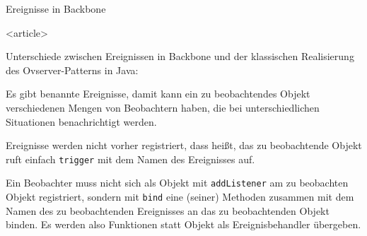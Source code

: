 
\begin{Frame}[fragile]{Ereignisse in Backbone}
  \begin{center}
    
  \end{center}
\end{Frame}

\mode
<article>

Unterschiede zwischen Ereignissen in Backbone und der klassischen Realisierung
des Ovserver-Patterns in Java:
\begin{compactitem}
  \item Es gibt benannte Ereignisse, damit kann ein zu beobachtendes Objekt
    verschiedenen Mengen von Beobachtern haben, die bei unterschiedlichen
    Situationen benachrichtigt werden.
  \item Ereignisse werden nicht vorher registriert, dass heißt, das zu beobachtende
    Objekt ruft einfach \lstinline-trigger- mit dem Namen des Ereignisses auf.
  \item Ein Beobachter muss nicht sich als Objekt mit \lstinline-addListener-
    am zu beobachten Objekt registriert, sondern mit \lstinline-bind-
    eine (seiner) Methoden zusammen mit dem Namen des zu beobachtenden
    Ereignisses an das zu beobachtenden Objekt binden. Es werden also
    Funktionen statt Objekt als Ereignisbehandler übergeben.
\end{compactitem}

